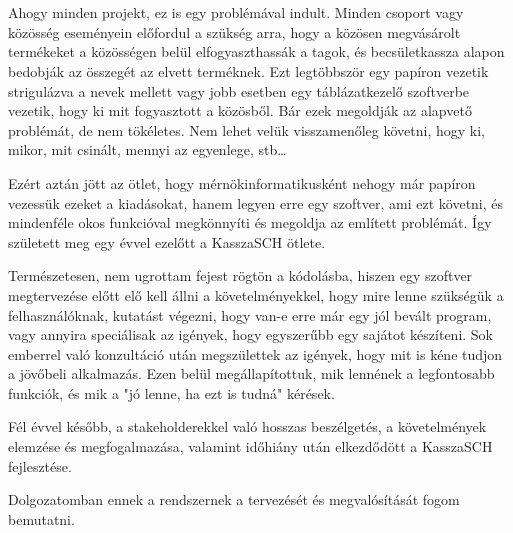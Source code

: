 \chapter{\bevezetes}

Ahogy minden projekt, ez is egy problémával indult. Minden csoport vagy közösség eseményein előfordul a szükség arra, hogy a közösen megvásárolt termékeket a közösségen belül elfogyaszthassák a tagok, és becsületkassza alapon bedobják az összegét az elvett terméknek. Ezt legtöbbször egy papíron vezetik strigulázva a nevek mellett vagy jobb esetben egy táblázatkezelő szoftverbe vezetik, hogy ki mit fogyasztott a közösből. Bár ezek megoldják az alapvető problémát, de nem tökéletes. Nem lehet velük visszamenőleg követni, hogy ki, mikor, mit csinált, mennyi az egyenlege, stb\ldots

Ezért aztán jött az ötlet, hogy mérnökinformatikusként nehogy már papíron vezessük ezeket a kiadásokat, hanem legyen erre egy szoftver, ami ezt követni, és mindenféle okos funkcióval megkönnyíti és megoldja az említett problémát. Így született meg egy évvel ezelőtt a KasszaSCH ötlete.

Természetesen, nem ugrottam fejest rögtön a kódolásba, hiszen egy szoftver megtervezése előtt elő kell állni a követelményekkel, hogy mire lenne szükségük a felhasználóknak, kutatást végezni, hogy van-e erre már egy jól bevált program, vagy annyira speciálisak az igények, hogy egyszerűbb egy sajátot készíteni. Sok emberrel való konzultáció után megszülettek az igények, hogy mit is kéne tudjon a jövőbeli alkalmazás. Ezen belül megállapítottuk, mik lennének a legfontosabb funkciók, és mik a "jó lenne, ha ezt is tudná" kérések.

Fél évvel később, a stakeholderekkel való hosszas beszélgetés, a követelmények elemzése és megfogalmazása, valamint időhiány után elkezdődött a KasszaSCH fejlesztése.

Dolgozatomban ennek a rendszernek a tervezését és megvalósítását fogom bemutatni.
